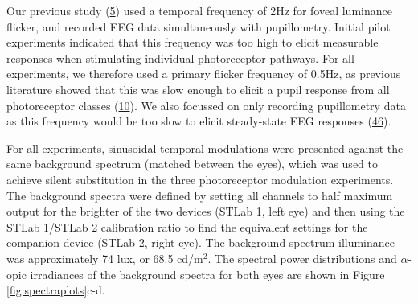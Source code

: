 \documentclass[
]{article}
\begin{document}
Our previous study (\protect\hyperlink{ref-Segala2023}{5}) used a temporal frequency of 2Hz for foveal luminance flicker, and recorded EEG data simultaneously with pupillometry. Initial pilot experiments indicated that this frequency was too high to elicit measurable responses when stimulating individual photoreceptor pathways. For all experiments, we therefore used a primary flicker frequency of 0.5Hz, as previous literature showed that this was slow enough to elicit a pupil response from all photoreceptor classes (\protect\hyperlink{ref-Spitschan2014}{10}). We also focussed on only recording pupillometry data as this frequency would be too slow to elicit steady-state EEG responses (\protect\hyperlink{ref-Norcia2015}{46}).

For all experiments, sinusoidal temporal modulations were presented against the same background spectrum (matched between the eyes), which was used to achieve silent substitution in the three photoreceptor modulation experiments. The background spectra were defined by setting all channels to half maximum output for the brighter of the two devices (STLab 1, left eye) and then using the STLab 1/STLab 2 calibration ratio to find the equivalent settings for the companion device (STLab 2, right eye). The background spectrum illuminance was approximately 74 lux, or 68.5 cd/m\(^2\). The spectral power distributions and \(\alpha\)-opic irradiances of the background spectra for both eyes are shown in Figure \ref{fig:spectraplots}c-d.
\end{document}
